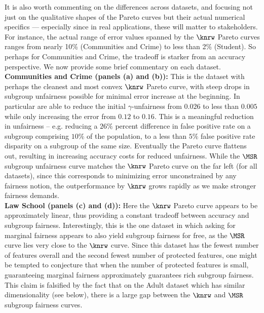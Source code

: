 It is also worth commenting on the differences across datasets, and focusing not just on the qualitative shapes of the
Pareto curves but their actual numerical specifics --- especially since in real applications, these will matter to stakeholders.
For instance, the actual range of error values spanned by the $\knrw$ Pareto curves ranges from nearly 10\% (Communities and Crime)
to less than 2\% (Student). So perhaps for Communities and Crime, the tradeoff is starker from an accuracy perspective. We now provide
some brief commentary on each dataset.\\

\noindent
{\bf Communities and Crime (panels (a) and (b)):}
This is the dataset with perhaps the cleanest and most convex $\knrw$ Pareto curve, with steep drops in subgroup unfairness possible
	for minimal error increase at the beginning.
	In particular are able to reduce the initial $\gamma$-unfairness
	from $0.026$ to less than $0.005$ while only increasing the error from $0.12$ to $0.16$.
	This is a meaningful reduction in unfairness -- e.g. reducing a $26\%$ percent difference
	in false positive rate on a subgroup comprising $10\%$ of the population,
	to a less than $5\%$ false positive rate disparity on a subgroup of the same size.
	Eventually the Pareto curve flattens out, resulting in increasing accuracy costs for reduced unfairness.
	While the $\MSR$ subgroup unfairness curve matches the $\knrw$ Pareto curve on the far left (for all datasets),
	since this corresponds to minimizing error unconstrained by any fairness notion, the outperformance by $\knrw$
	grows rapidly as we make stronger fairness demands.\\

\noindent
{\bf Law School (panels (c) and (d)):}
Here the $\knrw$ Pareto curve appears to be approximately linear, thus providing a constant tradeoff between accuracy and subgroup fairness.
	Interestingly, this is the one dataset in which asking for marginal fairness appears to also yield subgroup fairness for free,
	as the $\MSR$ curve lies very close to the $\knrw$ curve.
	Since this dataset has the fewest number of features overall and the second
	fewest number of protected features, one might be tempted to conjecture that when the
	number of protected features is small, guaranteeing marginal fairness approximately
	guarantees rich subgroup fairness. This claim is falsified by the fact that
	 on the Adult dataset which has similar dimensionality (see below), there is 
	a large gap between the $\knrw$ and $\MSR$ subgroup fairness curves.\\

